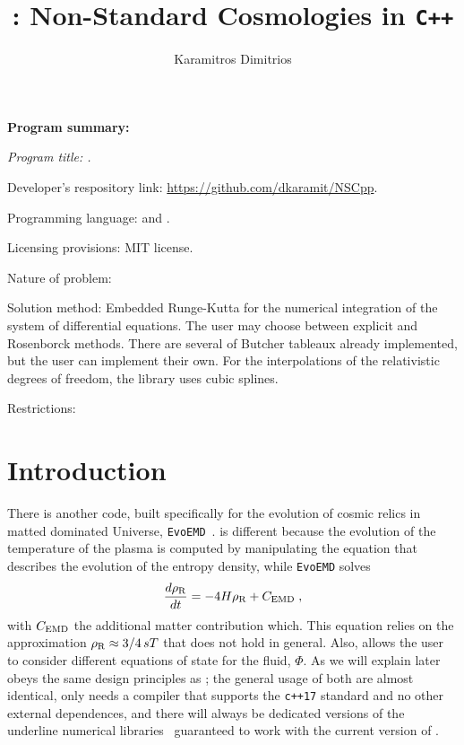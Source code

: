 \documentclass[11pt,a4paper]{article}
\author[ ]{Karamitros Dimitrios}
\affil[ ]{\em Department of Physics and Astronomy, The University of Manchester,}
\affil[ ]{\em Manchester M13 9PL, United Kingdom}
\affil[ ]{}
\affil[ ]{\textit{E-mail: } \href{mailto:dimitrios.karamitros@manchester.ac.uk}{\color{blue}{dimitrios.karamitros@manchester.ac.uk}}}
\title{\nsc: Non-Standard Cosmologies in {\tt C++}}
\begin{document}
\maketitle


\begin{abstract}
\end{abstract}

{\bf Program summary:}

{\sl 
	Program title: \nsc.
	
	Developer's respository link: \href{https://github.com/dkaramit/NSCpp}{https://github.com/dkaramit/NSCpp}.
	
	Programming language: \CPP and \PY.
	
	Licensing provisions: MIT license.
	
	Nature of problem: 
	
	Solution method: Embedded Runge-Kutta for the numerical integration of the system of differential equations. The user may choose between explicit and Rosenborck methods. There are several of Butcher tableaux already implemented, but the user can implement their own. For the interpolations of the relativistic degrees of freedom, the library uses cubic splines. 
	
	Restrictions: 
}

\tableofcontents




\section{Introduction}\label{sec:intro}
\setcounter{equation}{0}

There is another code, built specifically for the evolution of cosmic relics in matted dominated Universe, {\tt EvoEMD}~\cite{Dutra:2021phm}. \nsc is different because the evolution of the temperature of the plasma is computed by manipulating the equation that describes the evolution of the entropy density, while {\tt EvoEMD} solves
%
\begin{equation}
	\dfrac{d\rho_{\rm R}}{dt} = -4H\rho_{\rm R} + C_{\rm EMD} \;,
	\label{eq:EvoMD}
\end{equation}
%
with  $C_{\rm EMD}$ the additional matter contribution which. This equation relies on the approximation $\rho_{\rm R} \approx 3/4 \, sT$ that does not hold in general. Also, \nsc allows the user to consider different equations of state for the fluid, $\Phi$. 
%
As we will explain later \nsc obeys the same design principles as \mimes; \ie the general usage of both are almost identical, \nsc only needs a \CPP compiler that supports the {\tt c++17} standard and no other external dependences, and there will always be dedicated versions of the underline numerical libraries~\cite{NaBBODES,SimpleSplines} guaranteed to work with the current version of \nsc.
\end{document}
